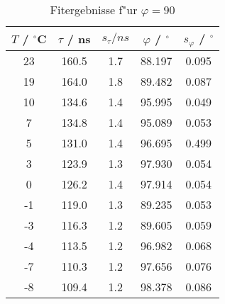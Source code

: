 \begin{table}[H]
\caption{Fitergebnisse f"ur $\varphi=90$}
\begin{center}
\begin{tabular}{|c|c|c|c|c|}
  \hline
  $T$ / ${}^{\circ}$C & $\tau$ / ns & $s_{\tau} / ns$ & $\varphi$ / ${}^{\circ}$ & $s_{\varphi}$ / ${}^{\circ}$ \\ \hline
  23 & 160.5 & 1.7 & 88.197 & 0.095 \\ \hline
  19 & 164.0 & 1.8 & 89.482 & 0.087 \\ \hline
  10 & 134.6 & 1.4 & 95.995 & 0.049 \\ \hline
  7 & 134.8 & 1.4 & 95.089 & 0.053 \\ \hline
  5 & 131.0 & 1.4 & 96.695 & 0.499 \\ \hline
  3 & 123.9 & 1.3 & 97.930 & 0.054 \\ \hline
  0 & 126.2 & 1.4 & 97.914 & 0.054 \\ \hline
  -1 & 119.0 & 1.3 & 89.235 & 0.053 \\ \hline
  -3 & 116.3 & 1.2 & 89.605 & 0.059 \\ \hline
  -4 & 113.5 & 1.2 & 96.982 & 0.068 \\ \hline
  -7 & 110.3 & 1.2 & 97.656 & 0.076 \\ \hline
  -8 & 109.4 & 1.2 & 98.378 & 0.086 \\ \hline
\end{tabular}
\end{center}
\label{tab:phi:90}
\end{table}

